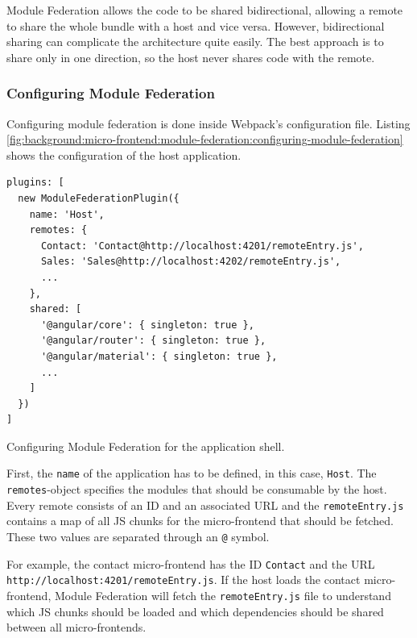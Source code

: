 \noindent Module Federation allows the code to be shared bidirectional, allowing a remote to share the whole bundle with a host and vice versa. However, bidirectional sharing can complicate the architecture quite easily. The best approach is to share only in one direction, so the host never shares code with the remote. \cite[119]{book:2021:mezzalira:applied-methods:building-micro-frontends}

\subsubsection{Configuring Module Federation}\label{subsubsection:background:micro-frontend:module-federation:configuring-module-federation}

Configuring module federation is done inside Webpack's configuration file. Listing \ref{fig:background:micro-frontend:module-federation:configuring-module-federation} shows the configuration of the host application.

\ifshowListings
\begin{listing}[H]
  \begin{verbatim}
plugins: [
  new ModuleFederationPlugin({
    name: 'Host',
    remotes: {
      Contact: 'Contact@http://localhost:4201/remoteEntry.js',
      Sales: 'Sales@http://localhost:4202/remoteEntry.js',
      ...
    },
    shared: [
      '@angular/core': { singleton: true },
      '@angular/router': { singleton: true },
      '@angular/material': { singleton: true },
      ...
    ]
  })
]
  \end{verbatim}
  \caption{Configuring Module Federation for the application shell.}\label{fig:background:micro-frontend:module-federation:configuring-module-federation}
\end{listing}
\fi

\noindent First, the \texttt{name} of the application has to be defined, in this case, \texttt{Host}. The \texttt{remotes}-object specifies the modules that should be consumable by the host. Every remote consists of an ID and an associated \ac{URL} and the \texttt{remoteEntry.js} contains a map of all \ac{JS} chunks for the micro-frontend that should be fetched. These two values are separated through an \texttt{@} symbol. \cite[124]{book:2021:mezzalira:applied-methods:building-micro-frontends}

\bigskip

\noindent For example, the contact micro-frontend has the ID \texttt{Contact} and the \ac{URL} \texttt{http:\slash \slash localhost:4201\slash remoteEntry.js}. If the host loads the contact micro-frontend, Module Federation will fetch the \texttt{remoteEntry.js} file to understand which \ac{JS} chunks should be loaded and which dependencies should be shared between all micro-frontends. \cite[125]{book:2021:mezzalira:applied-methods:building-micro-frontends}


